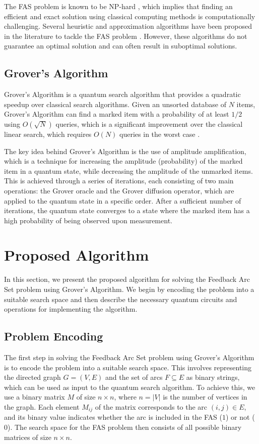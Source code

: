 The FAS problem is known to be NP-hard \cite{fas_np_hard}, which implies that finding an efficient and exact solution using classical computing methods is computationally challenging. Several heuristic and approximation algorithms have been proposed in the literature to tackle the FAS problem \cite{fas_heuristics,fas_approximations}. However, these algorithms do not guarantee an optimal solution and can often result in suboptimal solutions.

\subsection{Grover's Algorithm}
Grover's Algorithm is a quantum search algorithm that provides a quadratic speedup over classical search algorithms. Given an unsorted database of $N$ items, Grover's Algorithm can find a marked item with a probability of at least $1/2$ using $O(\sqrt{N})$ queries, which is a significant improvement over the classical linear search, which requires $O(N)$ queries in the worst case \cite{grover_bound}.

The key idea behind Grover's Algorithm is the use of amplitude amplification, which is a technique for increasing the amplitude (probability) of the marked item in a quantum state, while decreasing the amplitude of the unmarked items. This is achieved through a series of iterations, each consisting of two main operations: the Grover oracle and the Grover diffusion operator, which are applied to the quantum state in a specific order. After a sufficient number of iterations, the quantum state converges to a state where the marked item has a high probability of being observed upon measurement.

\section{Proposed Algorithm}
\label{sec:proposed_algorithm}
In this section, we present the proposed algorithm for solving the Feedback Arc Set problem using Grover's Algorithm. We begin by encoding the problem into a suitable search space and then describe the necessary quantum circuits and operations for implementing the algorithm.

\subsection{Problem Encoding}
The first step in solving the Feedback Arc Set problem using Grover's Algorithm is to encode the problem into a suitable search space. This involves representing the directed graph $G=(V,E)$ and the set of arcs $F \subseteq E$ as binary strings, which can be used as input to the quantum search algorithm. To achieve this, we use a binary matrix $M$ of size $n \times n$, where $n = |V|$ is the number of vertices in the graph. Each element $M_{ij}$ of the matrix corresponds to the arc $(i,j) \in E$, and its binary value indicates whether the arc is included in the FAS ($1$) or not ($0$). The search space for the FAS problem then consists of all possible binary matrices of size $n \times n$.

